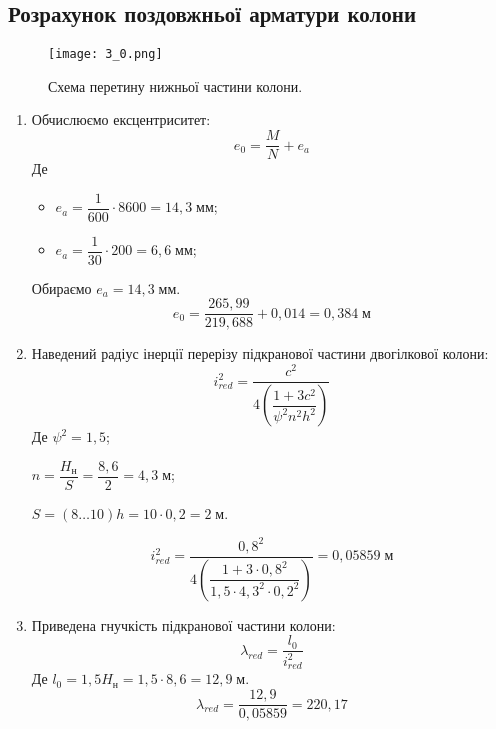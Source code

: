\documentclass[a4paper,14pt]{article}
\begin{document}
\subsection{Розрахунок поздовжньої арматури колони}

\begin{figure}[h!]
    \begin{center}
        \texttt{[image: 3\_0.png]}
        \caption{Схема перетину нижньої частини колони.}\label{ris3_0} 
    \end{center}
\end{figure}

\begin{enumerate}
    \item Обчислюємо ексцентриситет:
        \begin{equation}\label{eq:e_0}
            e_0 = \dfrac{M}{N}+e_a
        \end{equation}
        Де \begin{itemize}
                \item $e_a = \dfrac{1}{600} \cdot 8600 = 14,3\;\textit{мм}$;
                \item $e_a = \dfrac{1}{30} \cdot 200 = 6,6\;\textit{мм}$;
            \end{itemize}
        Обираємо $e_a = 14,3\;\textit{мм}$.
        $$e_0 = \dfrac{265,99}{219,688}+0,014 = 0,384\;\textit{м}$$
    \item Наведений радіус інерції перерізу підкранової частини двогілкової колони:
        \begin{equation}\label{eq:18}
            i_{red}^2 = \dfrac{c^2}{4 \left(\dfrac{1+3c^2}{\psi^2n^2h^2}\right)}
        \end{equation}
        Де $\psi^2 = 1,5$;

                $n = \dfrac{H_\textit{н}}{S} = \dfrac{8,6}{2} = 4,3\;\textit{м}$;

                $S = (8 \ldots 10)h = 10 \cdot 0,2 = 2\;\textit{м}$.
           
        $$i_{red}^2 = \dfrac{0,8^2}{4 \left(\dfrac{1+3 \cdot 0,8^2}{1,5 \cdot 4,3^2 \cdot 0,2^2}\right)} = 0,05859\;\textit{м}$$
    \item Приведена гнучкість підкранової частини колони:
        \begin{equation}\label{eq:19}
            \lambda_{red} = \dfrac{l_0}{i_{red}^2}
        \end{equation}
        Де $l_0 = 1,5H_\textit{н} = 1,5 \cdot 8,6 = 12,9\;\textit{м}$.
        $$\lambda_{red} = \dfrac{12,9}{0,05859} = 220,17$$
        

\end{enumerate}
\end{document}

